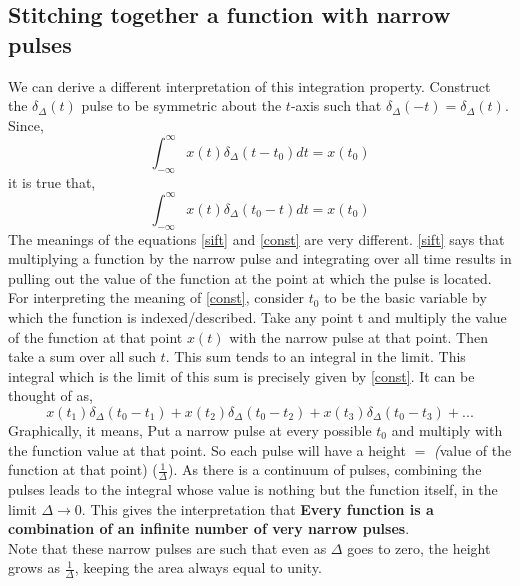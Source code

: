 \subsection{Stitching together a function with narrow pulses}
We can derive a different interpretation of this integration property. Construct the $\delta_{\Delta}(t)$ pulse to be symmetric about the $t$-axis such that $\delta_{\Delta}(-t) = \delta_{\Delta}(t)$.  %
Since, 
\begin{equation} \label{sift}
\int_{-\infty}^\infty x(t) \delta_{\Delta}(t - t_{0}) dt = x(t_{0})
\end{equation}
it is true that, 
\begin{equation} \label{const}
\int_{-\infty}^\infty x(t) \delta_{\Delta}( t_{0} - t) dt = x(t_{0})
\end{equation}
The meanings of the equations \eqref{sift} and \eqref{const} are very different. \eqref{sift} says that multiplying a function by the narrow pulse and integrating over all time results in pulling out the value of the function at the point at which the pulse is located.
\\

For interpreting the meaning of \eqref{const}, consider $t_{0}$ to be the basic variable by which the function is indexed/described. Take any point t and multiply the value of the function at that point $x(t)$ with the narrow pulse at that point. Then take a sum over all such $t$. This sum tends to an integral in the limit. This integral which is the limit of this sum is precisely given by \eqref{const}. It can be thought of as,
\begin{equation}
x(t_{1})\delta_{\Delta}(t_{0} - t_{1}) + x(t_{2})\delta_{\Delta}(t_{0} - t_{2}) + x(t_{3})\delta_{\Delta}(t_{0} - t_{3}) + ...
\end{equation}
Graphically, it means, %
Put a narrow pulse at every possible $t_{0}$ and multiply with the function value at that point. So each pulse will have a height $=$ \textit({value of the function at that point}) ($\frac{1}{\Delta}$). As there is a continuum of pulses, combining the pulses leads to the integral whose value is nothing but the function itself, in the limit $\Delta \rightarrow 0$. This gives the interpretation that 
{\bf Every function is a combination of an infinite number of very narrow pulses}.
\\

Note that these narrow pulses are such that even as $\Delta$ goes to zero, the height grows as $\frac{1}{\Delta}$, keeping the area always equal to unity. 